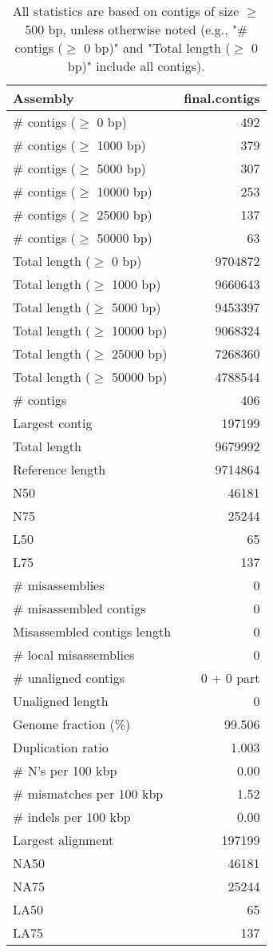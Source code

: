 \documentclass[12pt,a4paper]{article}
\begin{document}
\begin{table}[ht]
\begin{center}
\caption{All statistics are based on contigs of size $\geq$ 500 bp, unless otherwise noted (e.g., "\# contigs ($\geq$ 0 bp)" and "Total length ($\geq$ 0 bp)" include all contigs).}
\begin{tabular}{|l*{1}{|r}|}
\hline
Assembly & final.contigs \\ \hline
\# contigs ($\geq$ 0 bp) & 492 \\ \hline
\# contigs ($\geq$ 1000 bp) & 379 \\ \hline
\# contigs ($\geq$ 5000 bp) & 307 \\ \hline
\# contigs ($\geq$ 10000 bp) & 253 \\ \hline
\# contigs ($\geq$ 25000 bp) & 137 \\ \hline
\# contigs ($\geq$ 50000 bp) & 63 \\ \hline
Total length ($\geq$ 0 bp) & 9704872 \\ \hline
Total length ($\geq$ 1000 bp) & 9660643 \\ \hline
Total length ($\geq$ 5000 bp) & 9453397 \\ \hline
Total length ($\geq$ 10000 bp) & 9068324 \\ \hline
Total length ($\geq$ 25000 bp) & 7268360 \\ \hline
Total length ($\geq$ 50000 bp) & 4788544 \\ \hline
\# contigs & 406 \\ \hline
Largest contig & 197199 \\ \hline
Total length & 9679992 \\ \hline
Reference length & 9714864 \\ \hline
N50 & 46181 \\ \hline
N75 & 25244 \\ \hline
L50 & 65 \\ \hline
L75 & 137 \\ \hline
\# misassemblies & 0 \\ \hline
\# misassembled contigs & 0 \\ \hline
Misassembled contigs length & 0 \\ \hline
\# local misassemblies & 0 \\ \hline
\# unaligned contigs & 0 + 0 part \\ \hline
Unaligned length & 0 \\ \hline
Genome fraction (\%) & 99.506 \\ \hline
Duplication ratio & 1.003 \\ \hline
\# N's per 100 kbp & 0.00 \\ \hline
\# mismatches per 100 kbp & 1.52 \\ \hline
\# indels per 100 kbp & 0.00 \\ \hline
Largest alignment & 197199 \\ \hline
NA50 & 46181 \\ \hline
NA75 & 25244 \\ \hline
LA50 & 65 \\ \hline
LA75 & 137 \\ \hline
\end{tabular}
\end{center}
\end{table}
\end{document}
